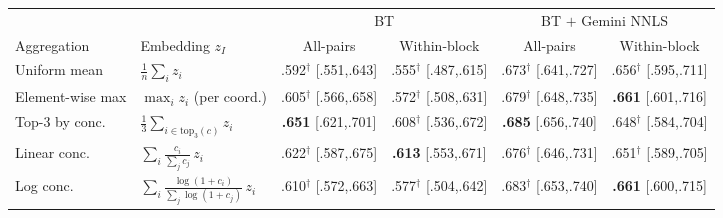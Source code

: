 \begin{center}
\label{tab:ingredient-agg-ablation}
\footnotesize
\setlength{\tabcolsep}{4pt}
\renewcommand{\arraystretch}{0.95}
\begin{tabular}{@{}llcccc@{}}
\toprule
\multicolumn{2}{c}{} & \multicolumn{2}{c}{BT} & \multicolumn{2}{c}{BT $+$ Gemini NNLS} \\
\cmidrule(lr){3-4} \cmidrule(lr){5-6}
Aggregation & Embedding $z_I$ & All-pairs & Within-block & All-pairs & Within-block \\
\midrule
Uniform mean & $\tfrac{1}{n}\sum_i z_i$ & .592$^\dag$ [.551,.643] & .555$^\dag$ [.487,.615] & .673$^\dag$ [.641,.727] & .656$^\dag$ [.595,.711] \\
Element-wise max & $\max_i z_i$ (per coord.) & .605$^\dag$ [.566,.658] & .572$^\dag$ [.508,.631] & .679$^\dag$ [.648,.735] & \textbf{.661} [.601,.716] \\
Top-3 by conc. & $\tfrac{1}{3}\sum_{i \in \mathrm{top}_3(c)} z_i$ & \textbf{.651} [.621,.701] & .608$^\dag$ [.536,.672] & \textbf{.685} [.656,.740] & .648$^\dag$ [.584,.704] \\
Linear conc. & $\sum_i \tfrac{c_i}{\sum_j c_j}\, z_i$ & .622$^\dag$ [.587,.675] & \textbf{.613} [.553,.671] & .676$^\dag$ [.646,.731] & .651$^\dag$ [.589,.705] \\
Log conc. & $\sum_i \tfrac{\log(1+c_i)}{\sum_j \log(1+c_j)}\, z_i$ & .610$^\dag$ [.572,.663] & .577$^\dag$ [.504,.642] & .683$^\dag$ [.653,.740] & \textbf{.661} [.600,.715] \\
\bottomrule
\end{tabular}
\end{center}
